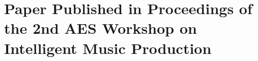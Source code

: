 
\chapter{Paper Published in Proceedings of the 2nd AES Workshop on Intelligent Music Production}
\label{appendix:jordal_paper}

\cleardoublepage



